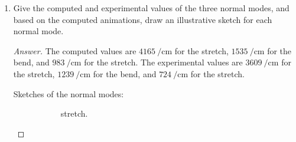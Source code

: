 \documentclass[../psets.tex]{subfiles}
\begin{document}
\begin{enumerate}
\begin{enumerate}
        \begin{proof}[Answer]
            The computed bond lengths and angle are $\boxed{\SI{1.006}{\angstrom}}$, $\boxed{\SI{1.738}{\angstrom}}$, and $\boxed{\ang{100.158}}$, respectively. The , and the ; as per the NIST database, the experimental values are $\SI{0.964}{\angstrom}$, $\SI{1.689}{\angstrom}$, and $\ang{102.450}$, respectively.
        \end{proof}
        \item Give the computed and experimental values of the three normal modes, and based on the computed animations, draw an illustrative sketch for each normal mode.
        \begin{proof}[Answer]
            The computed values are $\boxed{\SI{4165}{\per\centi\meter}}$ for the  stretch, $\boxed{\SI{1535}{\per\centi\meter}}$ for the bend, and $\boxed{\SI{983}{\per\centi\meter}}$ for the  stretch. The experimental values are $\boxed{\SI{3609}{\per\centi\meter}}$ for the  stretch, $\boxed{\SI{1239}{\per\centi\meter}}$ for the bend, and $\boxed{\SI{724}{\per\centi\meter}}$ for the  stretch.\par
            Sketches of the normal modes:
            \begin{figure}[h!]
                \centering
                \begin{subfigure}[b]{0.2\linewidth}
                    \centering
                    \caption{ stretch.}
                \end{subfigure}
                \begin{subfigure}[b]{0.2\linewidth}
                    \centering
                    \begin{tikzpicture}
                        \footnotesize

\end{tikzpicture}
\end{subfigure}
\end{figure}
\end{proof}
\end{enumerate}
\end{enumerate}
\end{document}

